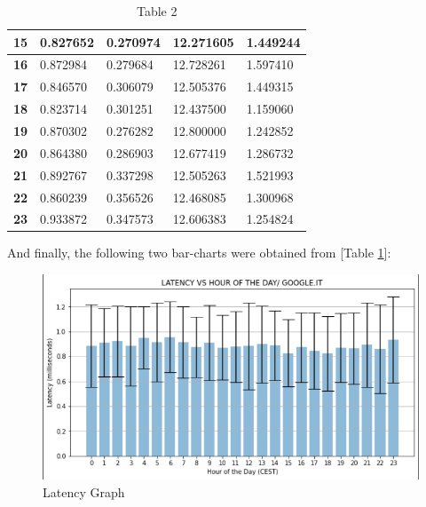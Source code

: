 \documentclass[a4paper,10pt]{article}
\begin{document}
\begin{table}[h!]
\begin{tabular}{|c|l|l|l|l|}
\textbf{15}                & 0.827652    & 0.270974              & 12.271605 & 1.449244       \\ \hline
\textbf{16}                & 0.872984    & 0.279684              & 12.728261 & 1.597410       \\ \hline
\textbf{17}                & 0.846570    & 0.306079              & 12.505376 & 1.449315       \\ \hline
\textbf{18}                & 0.823714    & 0.301251              & 12.437500 & 1.159060       \\ \hline
\textbf{19}                & 0.870302    & 0.276282              & 12.800000 & 1.242852       \\ \hline
\textbf{20}                & 0.864380    & 0.286903              & 12.677419 & 1.286732       \\ \hline
\textbf{21}                & 0.892767    & 0.337298              & 12.505263 & 1.521993       \\ \hline
\textbf{22}                & 0.860239    & 0.356526              & 12.468085 & 1.300968       \\ \hline
\textbf{23}                & 0.933872    & 0.347573              & 12.606383 & 1.254824       \\ \hline
\end{tabular}

\caption{Table 2}
\label{fig:table2}

\end{table}

\clearpage

And finally, the following two bar-charts were obtained from [Table \ref{fig:table2}]:




\begin{figure}[h!]
\centering
\includegraphics[scale=0.4]{latency_graph}
\caption{Latency Graph}
\label{fig:latency_graph}
\end{figure}
\end{document}
